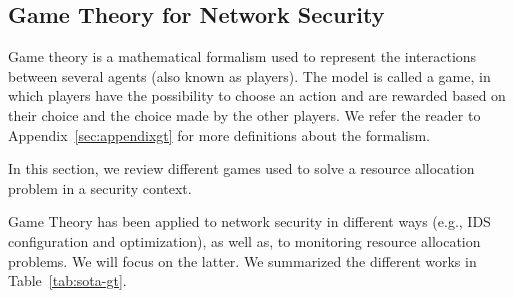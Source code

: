 \subsection{Game Theory for Network Security}

Game theory is a mathematical formalism used to represent the interactions between several agents (also known as players).
The model is called a game, in which players have the possibility to choose an action and are rewarded based on their choice and the choice made by the other players. We refer the reader to Appendix~\ref{sec:appendixgt} for more definitions about the formalism.

In this section, we review different games used to solve a resource allocation problem in a security context.

Game Theory has been applied to network security in different ways (e.g., IDS configuration and optimization), as well as, to monitoring resource allocation problems. We will focus on the latter. We summarized the different works in Table~\ref{tab:sota-gt}.

